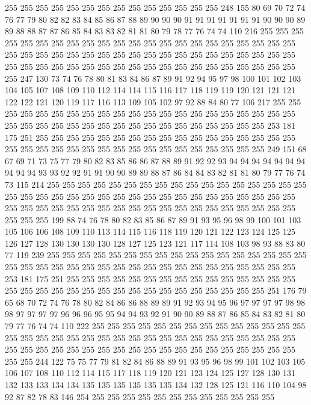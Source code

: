 255 255 255 255 255 255 255 255 255 255 255 255 255 255 248 155 80 69 70 72
74 76 77 79 80 82 82 83 84 85 86 87 88 89 90 90 90 91 91 91
91 91 91 91 90 90 90 89 89 88 88 87 87 86 85 84 83 83 82 81
81 80 79 78 77 76 74 74 110 216 255 255 255 255 255 255 255 255 255 255
255 255 255 255 255 255 255 255 255 255 255 255 255 255 255 255 255 255 255 255
255 255 255 255 255 255 255 255 255 255 255 255 255 255 255 255 255 255 255 255
255 255 255 255 255 255 255 255 255 255 255 247 130 73 74 76 78 80 81 83
84 86 87 89 91 92 94 95 97 98 100 101 102 103 104 105 107 108 109 110
112 114 114 115 116 117 118 119 119 120 121 121 121 122 122 121 120 119 117 116
113 109 105 102 97 92 88 84 80 77 106 217 255 255 255 255 255 255 255 255
255 255 255 255 255 255 255 255 255 255 255 255 255 255 255 255 255 255 255 255
255 255 255 255 255 255 255 255 255 255 253 181 175 251 255 255 255 255 255 255
255 255 255 255 255 255 255 255 255 255 255 255 255 255 255 255 255 255 255 255
255 255 255 255 255 255 255 255 249 151 68 67 69 71 73 75 77 79 80 82
83 85 86 86 87 88 89 91 92 92 93 94 94 94 94 94 94 94 94 94
94 93 93 92 92 91 91 90 90 89 89 88 87 86 84 84 83 82 81 81
80 79 77 76 74 73 115 214 255 255 255 255 255 255 255 255 255 255 255 255
255 255 255 255 255 255 255 255 255 255 255 255 255 255 255 255 255 255 255 255
255 255 255 255 255 255 255 255 255 255 255 255 255 255 255 255 255 255 255 255
255 255 255 255 255 255 199 88 74 76 78 80 82 83 85 86 87 89 91 93
95 96 98 99 100 101 103 105 106 106 108 109 110 113 114 115 116 118 119 120
121 122 123 124 125 125 126 127 128 130 130 130 130 128 127 125 123 121 117 114
108 103 98 93 88 83 80 77 119 239 255 255 255 255 255 255 255 255 255 255
255 255 255 255 255 255 255 255 255 255 255 255 255 255 255 255 255 255 255 255
255 255 255 255 255 255 253 181 175 251 255 255 255 255 255 255 255 255 255 255
255 255 255 255 255 255 255 255 255 255 255 255 255 255 255 255 255 255 255 255
255 255 251 176 79 65 68 70 72 74 76 78 80 82 84 86 86 88 89 89
91 92 93 94 95 96 97 97 97 97 98 98 98 97 97 97 97 96 96 96
95 95 94 94 93 92 91 90 90 89 88 87 86 85 84 83 82 81 80 79
77 76 74 74 110 222 255 255 255 255 255 255 255 255 255 255 255 255 255 255
255 255 255 255 255 255 255 255 255 255 255 255 255 255 255 255 255 255 255 255
255 255 255 255 255 255 255 255 255 255 255 255 255 255 255 255 255 255 255 255
244 122 75 75 77 79 81 82 84 86 88 89 91 93 95 96 98 99 101 102
103 105 106 107 108 110 112 114 115 117 118 119 120 121 123 124 125 127 128 130
131 132 133 133 134 134 135 135 135 135 135 135 134 132 128 125 121 116 110 104
98 92 87 82 78 83 146 254 255 255 255 255 255 255 255 255 255 255 255 255

